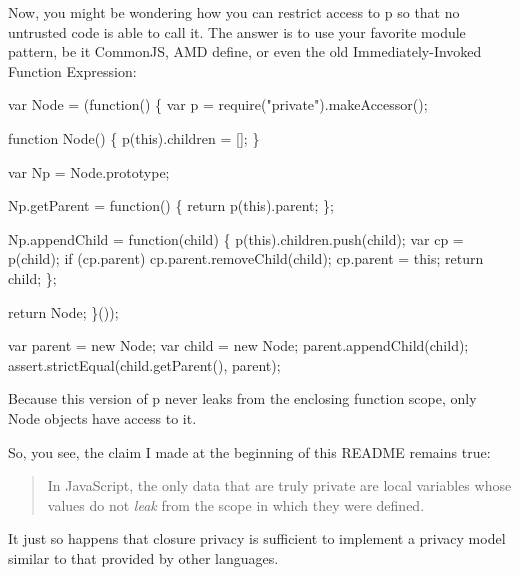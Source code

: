 Now, you might be wondering how you can restrict access to {\ttfamily p} so that no untrusted code is able to call it. The answer is to use your favorite module pattern, be it Common\+JS, A\+MD {\ttfamily define}, or even the old Immediately-\/\+Invoked Function Expression\+: 
\begin{DoxyCode}
var Node = (function() \{
    var p = require("private").makeAccessor();

    function Node() \{
        p(this).children = [];
    \}

    var Np = Node.prototype;

    Np.getParent = function() \{
        return p(this).parent;
    \};

    Np.appendChild = function(child) \{
        p(this).children.push(child);
        var cp = p(child);
        if (cp.parent)
            cp.parent.removeChild(child);
        cp.parent = this;
        return child;
    \};

    return Node;
\}());

var parent = new Node;
var child = new Node;
parent.appendChild(child);
assert.strictEqual(child.getParent(), parent);
\end{DoxyCode}
 Because this version of {\ttfamily p} never leaks from the enclosing function scope, only {\ttfamily Node} objects have access to it.

So, you see, the claim I made at the beginning of this R\+E\+A\+D\+ME remains true\+:

\begin{quote}
In Java\+Script, the only data that are truly private are local variables whose values do not {\itshape leak} from the scope in which they were defined. \end{quote}


It just so happens that closure privacy is sufficient to implement a privacy model similar to that provided by other languages. 
